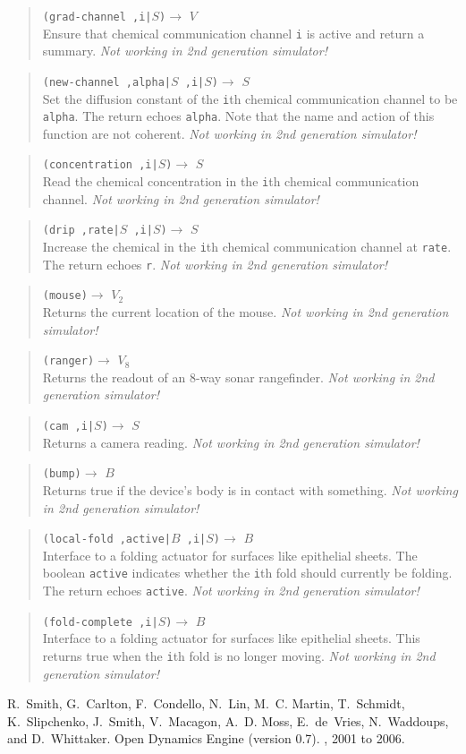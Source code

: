 \documentclass{article}
\newcommand\nosecgen{{\em Not working in 2nd generation simulator!}}
\newcommand\var[1]{{\tt #1}}
\newcommand\function[3]
{\begin{quote}{\tt #1}$\rightarrow$ \type{#2} \\ #3 \end{quote}}
\newcommand\type[1]{$#1$}
\begin{document}
\function{(grad-channel ,i|\type{S})}{V}{Ensure that chemical
  communication channel \var{i} is active and return a summary.
  \nosecgen{}}
\function{(new-channel ,alpha|\type{S} ,i|\type{S})}{S}{Set the
  diffusion constant of the \var{i}th chemical communication channel
  to be \var{alpha}.  The return echoes \var{alpha}.  Note that the
  name and action of this function are not coherent.  \nosecgen{}}
\function{(concentration  ,i|\type{S})}{S}{Read the chemical 
  concentration in the \var{i}th chemical communication channel.
  \nosecgen{}}
\function{(drip ,rate|\type{S} ,i|\type{S})}{S}{Increase the chemical
  in the \var{i}th chemical communication channel at \var{rate}.  The
  return echoes \var{r}.  \nosecgen{}}

\function{(mouse)}{V_2}{Returns the current location of the
  mouse. \nosecgen{}}
\function{(ranger)}{V_8}{Returns the readout of an 8-way sonar rangefinder.
  \nosecgen{}}
\function{(cam ,i|\type{S})}{S}{Returns a camera reading. \nosecgen{}}
\function{(bump)}{B}{Returns true if the device's body is in contact
  with something. \nosecgen{}}

\function{(local-fold ,active|\type{B} ,i|\type{S})}{B}{Interface to
  a folding actuator for surfaces like epithelial sheets.  The boolean
  \var{active} indicates whether the \var{i}th fold should currently
  be folding.  The return echoes \var{active}.  \nosecgen{}}
\function{(fold-complete ,i|\type{S})}{B}{Interface to a folding 
  actuator for surfaces like epithelial sheets.  This returns true
  when the \var{i}th fold is no longer moving.  \nosecgen{}}



\begin{thebibliography}{}
R.~Smith, G.~Carlton, F.~Condello, N.~Lin, M.~C. Martin, T.~Schmidt,
  K.~Slipchenko, J.~Smith, V.~Macagon, A.~D. Moss, E.~de~Vries, N.~Waddoups,
  and D.~Whittaker.
\newblock Open Dynamics Engine (version 0.7).
, 2001 to 2006.
\end{thebibliography}
\end{document}
